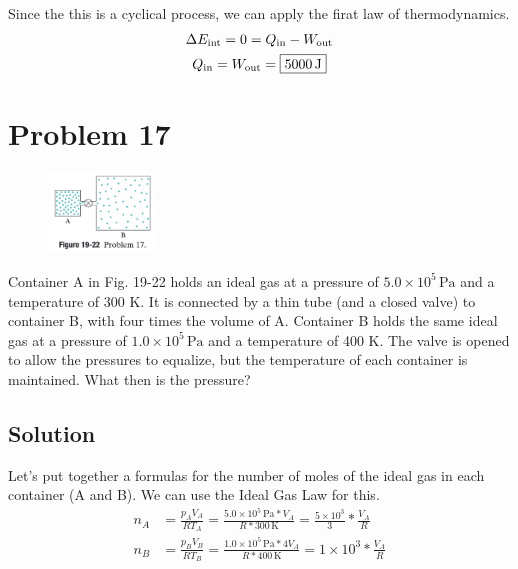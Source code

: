 \documentclass[12pt]{article}
\begin{document}
            Since the this is a cyclical process, we can apply the firat law of thermodynamics.
            \begin{gather}
                \Delta E_{\rm int}  =   0   =   Q_{\rm in} - W_{\rm out}\\
                Q_{\rm in}  =   W_{\rm out} =   \boxed{5000\,\unit{\joule}}
            \end{gather}

    \pagebreak
    \section{Problem 17}
        \begin{figure}
            \vspace{-30pt}
            \includegraphics[width=0.25\textwidth]{picture_19-22.png} 
        \end{figure}
        Container A in Fig. 19-22 holds an ideal gas at a pressure of $5.0 \times 10^5\,\unit{\pascal}$ and a temperature of 300 K. 
        It is connected by a thin tube (and a closed valve) to container B, with four times the volume of A. 
        Container B holds the same ideal gas at a pressure of $1.0 \times 10^5\,\unit{\pascal}$ and a temperature of 400 K. 
        The valve is opened to allow the pressures to equalize, but the temperature of each container is maintained. 
        What then is the pressure?

        \subsection{Solution}
            Let's put together a formulas for the number of moles of the ideal gas in each container (A and B). 
            We can use the Ideal Gas Law for this.
            \begin{align}
                n_A &=  \frac{p_A V_A}{R T_A}
                    =   \frac{5.0 \times 10^5\,\unit{\pascal} * V_A}{R * 300\,\unit{\kelvin}}
                    =   \frac{5 \times 10^3}{3} * \frac{V_A}{R}\\
                n_B &=  \frac{p_B V_B}{R T_B}
                    =   \frac{1.0 \times 10^5\,\unit{\pascal} * 4 V_A}{R * 400\,\unit{\kelvin}}
                    =   1 \times 10^3 * \frac{V_A}{R}
            \end{align}
\end{document}
